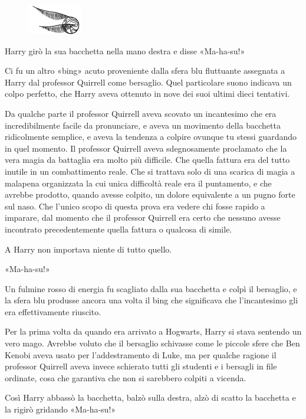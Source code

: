 \begin{figure}[h!]
        \includegraphics[scale=0.4]{boccino.png}
        \centering
\end{figure}

Harry girò la sua bacchetta nella mano destra e disse «Ma-ha-su!»

Ci fu un altro «bing» acuto proveniente dalla sfera blu fluttuante assegnata a Harry dal professor Quirrell come bersaglio. Quel particolare suono indicava un colpo perfetto, che Harry aveva ottenuto in nove dei suoi ultimi dieci tentativi.

Da qualche parte il professor Quirrell aveva scovato un incantesimo che era incredibilmente facile da pronunciare, e aveva un movimento della bacchetta ridicolmente semplice, e aveva la tendenza a colpire ovunque tu stessi guardando in quel momento. Il professor Quirrell aveva sdegnosamente proclamato che la vera magia da battaglia era molto più difficile. Che quella fattura era del tutto inutile in un combattimento reale. Che si trattava solo di una scarica di magia a malapena organizzata la cui unica difficoltà reale era il puntamento, e che avrebbe prodotto, quando avesse colpito, un dolore equivalente a un pugno forte sul naso. Che l’unico scopo di questa prova era vedere chi fosse rapido a imparare, dal momento che il professor Quirrell era certo che nessuno avesse incontrato precedentemente quella fattura o qualcosa di simile.

A Harry non importava niente di tutto quello.

«Ma-ha-su!»

Un fulmine rosso di energia fu scagliato dalla sua bacchetta e colpì il bersaglio, e la sfera blu produsse ancora una volta il bing che significava che l’incantesimo gli era effettivamente riuscito.

Per la prima volta da quando era arrivato a Hogwarts, Harry si stava sentendo un vero mago. Avrebbe voluto che il bersaglio schivasse come le piccole sfere che Ben Kenobi aveva usato per l’addestramento di Luke, ma per qualche ragione il professor Quirrell aveva invece schierato tutti gli studenti e i bersagli in file ordinate, cosa che garantiva che non si sarebbero colpiti a vicenda.

Così Harry abbassò la bacchetta, balzò sulla destra, alzò di scatto la bacchetta e la rigirò gridando «Ma-ha-su!»

